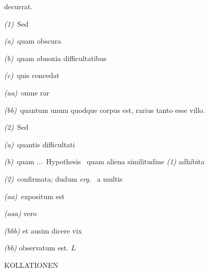 \vspace{1.0ex}	
\enskip decurrat.\par\noindent
\hspace{7mm}\textit{(1)}\ Sed\par\noindent
\hspace{14mm}\textit{(a)}\ quam obscura\par\noindent
\hspace{14mm}\textit{(b)}\ quam obnoxia difficultatibus\par\noindent
\hspace{14mm}\textit{(c)}\ quis concedat\par\noindent
\hspace{21mm}\textit{(aa)}\ omne rar\par\noindent
\hspace{21mm}\textit{(bb)}\ quantum unum quodque corpus est, rarius tanto esse villo.\par\noindent
\hspace{7mm}\textit{(2)}\ Sed\par\noindent
\hspace{14mm}\textit{(a)}\ quantis difficultati\par\noindent
\hspace{14mm}\textit{(b)}\ quam \lbrack...\rbrack\ Hypothesis \textbar\ quam aliena similitudine \textit{(1)} adhibita\par\noindent
\hspace{8.25cm}\textit{(2)}\ confirmata; dudum \textit{erg.} \textbar\ a
multis\par\noindent
\hspace{21mm}\textit{(aa)}\ expositum est\par\noindent
\hspace{29mm}\textit{(aaa)} vero\par\noindent
\hspace{29mm}\textit{(bbb)} et ausim dicere vix\par\noindent
\hspace{21mm}\textit{(bb)} observatum est. \textit{L}
\par
\newpage%
\normalsize
\noindent\uppercase{Kollationen}\par\vspace{1.0ex}
\noindent
